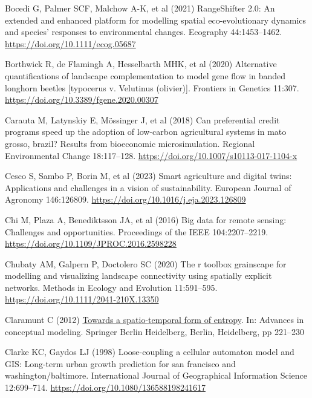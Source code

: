 \documentclass[
  10pt,
  a4paperpaper,
]{article}
\newlength{\cslhangindent}
\newenvironment{CSLReferences}[2] %
 {\begin{list}{}{%
  \setlength{\itemindent}{0pt}
  \setlength{\leftmargin}{0pt}
  \setlength{\parsep}{0pt}
  \ifodd #1
   \setlength{\leftmargin}{\cslhangindent}
   \setlength{\itemindent}{-1\cslhangindent}
  \fi
  \setlength{\itemsep}{#2\baselineskip}}}
 {\end{list}}
\begin{document}
\begin{CSLReferences}{1}{1}
Bocedi G, Palmer SCF, Malchow A-K, et al (2021) RangeShifter 2.0: An
extended and enhanced platform for modelling spatial eco-evolutionary
dynamics and species' responses to environmental changes. Ecography
44:1453--1462. \url{https://doi.org/10.1111/ecog.05687}

Borthwick R, de Flamingh A, Hesselbarth MHK, et al (2020) Alternative
quantifications of landscape complementation to model gene flow in
banded longhorn beetles {[}typocerus v. Velutinus (olivier){]}.
Frontiers in Genetics 11:307.
\url{https://doi.org/10.3389/fgene.2020.00307}

Carauta M, Latynskiy E, Mössinger J, et al (2018) Can preferential
credit programs speed up the adoption of low-carbon agricultural systems
in mato grosso, brazil? Results from bioeconomic microsimulation.
Regional Environmental Change 18:117--128.
\url{https://doi.org/10.1007/s10113-017-1104-x}

Cesco S, Sambo P, Borin M, et al (2023) Smart agriculture and digital
twins: Applications and challenges in a vision of sustainability.
European Journal of Agronomy 146:126809.
\url{https://doi.org/10.1016/j.eja.2023.126809}

Chi M, Plaza A, Benediktsson JA, et al (2016) Big data for remote
sensing: Challenges and opportunities. Proceedings of the IEEE
104:2207--2219. \url{https://doi.org/10.1109/JPROC.2016.2598228}

Chubaty AM, Galpern P, Doctolero SC (2020) The r toolbox grainscape for
modelling and visualizing landscape connectivity using spatially
explicit networks. Methods in Ecology and Evolution 11:591--595.
\url{https://doi.org/10.1111/2041-210X.13350}

Claramunt C (2012)
\href{https://doi.org/10.1007/978-3-642-33999-8_28}{Towards a
spatio-temporal form of entropy}. In: Advances in conceptual modeling.
Springer Berlin Heidelberg, Berlin, Heidelberg, pp 221--230

Clarke KC, Gaydos LJ (1998) Loose-coupling a cellular automaton model
and GIS: Long-term urban growth prediction for san francisco and
washington/baltimore. International Journal of Geographical Information
Science 12:699--714. \url{https://doi.org/10.1080/136588198241617}


\end{CSLReferences}
\end{document}
